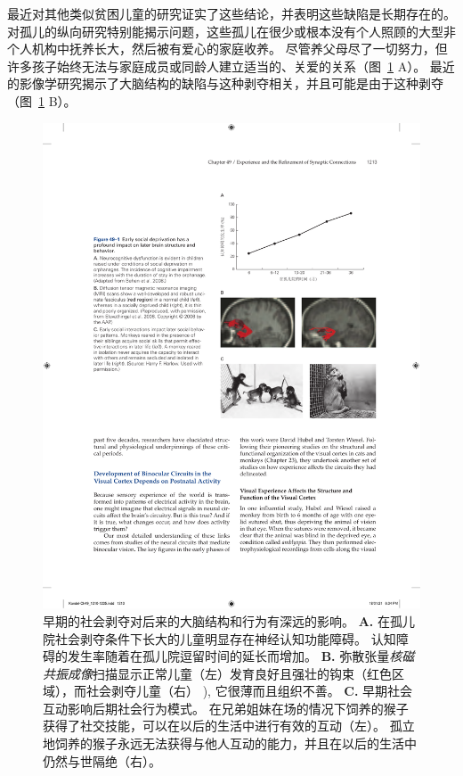 最近对其他类似贫困儿童的研究证实了这些结论，并表明这些缺陷是长期存在的。
对孤儿的纵向研究特别能揭示问题，这些孤儿在很少或根本没有个人照顾的大型非个人机构中抚养长大，然后被有爱心的家庭收养。
尽管养父母尽了一切努力，但许多孩子始终无法与家庭成员或同龄人建立适当的、关爱的关系（图~\ref{fig:49_1} A）。
最近的影像学研究揭示了大脑结构的缺陷与这种剥夺相关，并且可能是由于这种剥夺（图~\ref{fig:49_1} B）。


\begin{figure}[htbp]
	\centering
	\includegraphics[width=0.89\linewidth]{chap49/fig_49_1}
	\caption{早期的社会剥夺对后来的大脑结构和行为有深远的影响。
		\textbf{A.} 在孤儿院社会剥夺条件下长大的儿童明显存在神经认知功能障碍。
		认知障碍的发生率随着在孤儿院逗留时间的延长而增加\cite{behen2008incidence}。
		\textbf{B.} 弥散张量\textit{核磁共振成像}扫描显示正常儿童（左）发育良好且强壮的钩束（红色区域），而社会剥夺儿童（右） ), 它很薄而且组织不善\cite{eluvathingal2006abnormal}。
		\textbf{C.} 早期社会互动影响后期社会行为模式。
		在兄弟姐妹在场的情况下饲养的猴子获得了社交技能，可以在以后的生活中进行有效的互动（左）。
		孤立地饲养的猴子永远无法获得与他人互动的能力，并且在以后的生活中仍然与世隔绝（右）。}
	\label{fig:49_1}
\end{figure}


